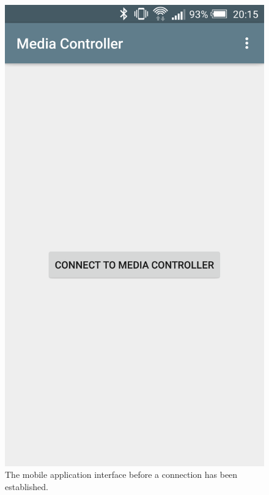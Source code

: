 \documentclass{article}
\begin{document}
			\begin{figure}[h]
				\centering
				\begin{minipage}[h]{0.29\textwidth}
					\centering
					\includegraphics[width=\textwidth]{app01}
					\caption{The mobile application interface before a connection has been established.}
					\label{fig:app01}
				\end{minipage}
				\hfill
				\begin{minipage}[h]{0.29\textwidth}
					\centering

\end{minipage}
\end{figure}
\end{document}
